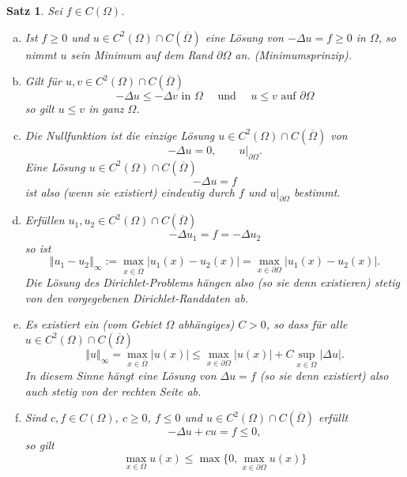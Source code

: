 \documentclass[12pt,a4paper]{book}
\theoremstyle{break}
\newtheorem{theorem}{Satz}[chapter]
\theoremstyle{nonumberplain}
\newcommand{\norm}[1]{\left\Vert#1\right\Vert}		%
\newcommand{\1}{\mathbbm{1}} 			      	%
\begin{document}
\begin{theorem}\label{thm:MaxPrinzipFolgerungen}
Sei $f\in C(\Omega)$. 
\begin{enumerate}[(a)]
\item Ist $f\geq 0$ und $u\in C^2(\Omega)\cap C(\overline\Omega)$ eine Lösung von 
$-\Delta u=f\geq 0$ in $\Omega$, so nimmt $u$ sein Minimum auf dem
Rand $\partial \Omega$ an. (\emph{Minimumsprinzip}).
%
\item Gilt für $u,v\in C^2(\Omega)\cap C(\overline\Omega)$
\[
-\Delta u\leq -\Delta v \mbox{ in $\Omega$} \quad \mbox{ und } \quad u\leq v \mbox{ auf $\partial \Omega$}
\]
so gilt $u\leq v$ in ganz $\Omega$.
%
\item Die Nullfunktion ist die einzige Lösung $u\in C^2(\Omega)\cap C(\overline\Omega)$ von \[
-\Delta u=0, \qquad u|_{\partial \Omega}.
\]
Eine Lösung $u\in C^2(\Omega)\cap C(\overline\Omega)$ 
\[
-\Delta u=f
\]
ist also (wenn sie existiert) eindeutig durch $f$ und $u|_{\partial \Omega}$ bestimmt.
%
\item Erfüllen $u_1,u_2\in C^2(\Omega)\cap C(\overline\Omega)$ 
\[
-\Delta u_1=f= -\Delta u_2
\]
so ist 
\[
\norm{u_1-u_2}_\infty:=\max_{x\in \overline{\Omega}}|u_1(x)-u_2(x)|=\max_{x\in \partial \Omega}|u_1(x)-u_2(x)|.
\]
Die Lösung des Dirichlet-Problems hängen also (so sie denn existieren) stetig von den vorgegebenen Dirichlet-Randdaten ab.
%
\item Es existiert ein (vom Gebiet $\Omega$ abhängiges) $C>0$, so dass für alle $u\in C^2(\Omega)\cap C(\overline\Omega)$ 
\[
\norm{u}_\infty=\max_{x\in \overline\Omega} |u(x)|\leq \max_{x\in \partial \Omega} |u(x)|+C\sup_{x\in \Omega} |\Delta u|.
\]
In diesem Sinne hängt eine Lösung von $\Delta u=f$ (so sie denn existiert) also auch stetig von der rechten Seite ab.
%
\item Sind $c,f\in C(\Omega)$, $c\geq 0$, $f\leq 0$ und $u\in C^2(\Omega)\cap C(\overline\Omega)$ erfüllt
\[
-\Delta u + cu =f \leq 0,
\]
so gilt
\[
\max_{x\in \Omega}{u(x)} \leq \max\{0,\max_{x\in \partial \Omega}{u(x)}\}
\]

\end{enumerate}
\end{theorem}
\end{document}
